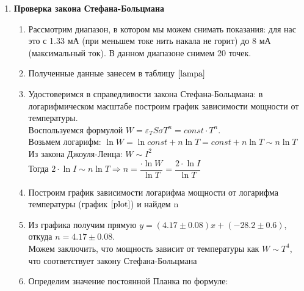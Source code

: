 \documentclass[a4paper,12pt]{article}
\begin{document}
\begin{enumerate}
\begin{enumerate}
\end{enumerate}
\item \textbf{Проверка закона Стефана-Больцмана}
\begin{enumerate}
\item Рассмотрим диапазон, в котором мы можем снимать показания: для нас это с 1.33 мА (при меньшем токе нить накала не горит) до 8 мА (максимальный ток). В данном диапазоне снимем 20 точек.
\item Полученные данные занесем в таблицу $\ref{lampa}$
\item Удостоверимся в справедливости закона Стефана-Больцмана: в логарифмическом масштабе построим график зависимости мощности от температуры.\\ Воспользуемся формулой $W = \varepsilon_T S\sigma T^n = const\cdot T^n$. \\
Возьмем логарифм: $\ln W = \ln const + n\ln T = const + n\ln T \sim n\ln T$\\
Из закона Джоуля-Ленца: $W \sim I^2$\\
Тогда $2\cdot\ln I \sim n\ln T \Rightarrow n = \dfrac{\cdot\ln W}{\ln T} = \dfrac{2\cdot\ln I}{\ln T}$ 
\item Построим график зависимости логарифма мощности от логарифма температуры (график $\ref{plot}$) и найдем n 
\item Из графика получим прямую $y = (4.17 \pm 0.08)x + (-28.2 \pm 0.6)$, откуда $n = 4.17 \pm 0.08$.\\ Можем заключить, что мощность зависит от температуры как $W \sim T^4$, что соответствует закону Стефана-Больцмана
\item Определим значение постоянной Планка по формуле: 
\end{enumerate}


\end{enumerate}
\end{document}
